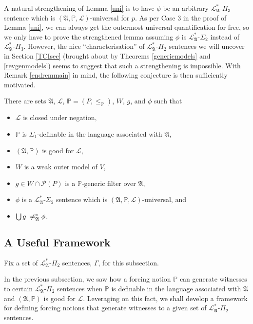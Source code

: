 \documentclass[12pt]{article}
\numberwithin{equation}{section}
\begin{document}
A natural strengthening of Lemma \ref{uni} is to have $\phi$ be an arbitrary $\mathcal{L}^{*}_{\mathfrak{A}}$-$\Pi_3$ sentence which is $(\mathfrak{A}, \mathbb{P}, \mathcal{L})$-universal for $p$. As per Case 3 in the proof of Lemma \ref{uni}, we can always get the outermost universal quantification for free, so we only have to prove the strengthened lemma assuming $\phi$ is $\mathcal{L}^{*}_{\mathfrak{A}}$-$\Sigma_2$ instead of $\mathcal{L}^{*}_{\mathfrak{A}}$-$\Pi_3$. However, the nice ``characterisation'' of $\mathcal{L}^{*}_{\mathfrak{A}}$-$\Pi_2$ sentences we will uncover in Section \ref{TCIsec} (brought about by Theorems \ref{genericmodels} and \ref{revgenmodels}) seems to suggest that such a strengthening is impossible. With Remark \ref{endremmain} in mind, the following conjecture is then sufficiently motivated.

\begin{conj}
There are sets $\mathfrak{A}$, $\mathcal{L}$, $\mathbb{P} = (P, \leq_{\mathbb{P}})$, $W$, $g$, and $\phi$ such that
\begin{itemize}
    \item $\mathcal{L}$ is closed under negation,
    \item $\mathbb{P}$ is $\Sigma_1$-definable in the language associated with $\mathfrak{A}$,
    \item $(\mathfrak{A}, \mathbb{P})$ is good for $\mathcal{L}$,
    \item $W$ is a weak outer model of $V$,
    \item $g \in W \cap \mathcal{P}(P)$ is a $\mathbb{P}$-generic filter over $\mathfrak{A}$,
    \item $\phi$ is a $\mathcal{L}^{*}_{\mathfrak{A}}$-$\Sigma_2$ sentence which is $(\mathfrak{A}, \mathbb{P}, \mathcal{L})$-universal, and
    \item $\bigcup g \ \not \! \models^{*}_{\mathfrak{A}} \phi$.
\end{itemize}
\end{conj}

\subsection{A Useful Framework}\label{forframe}

Fix a set of $\mathcal{L}^*_{\mathfrak{A}}$-$\Pi_2$ sentences, $\Gamma$, for this subsection.

In the previous subsection, we saw how a forcing notion $\mathbb{P}$ can generate witnesses to certain $\mathcal{L}^*_{\mathfrak{A}}$-$\Pi_2$ sentences when $\mathbb{P}$ is definable in the language associated with $\mathfrak{A}$ and $(\mathfrak{A}, \mathbb{P})$ is good for $\mathcal{L}$. Leveraging on this fact, we shall develop a framework for defining forcing notions that generate witnesses to a given set of $\mathcal{L}^*_{\mathfrak{A}}$-$\Pi_2$ sentences. 
\end{document}
